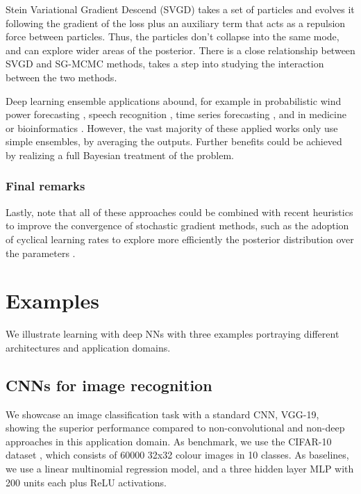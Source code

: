 Stein Variational Gradient Descend (SVGD) \citep{svgd} takes a set of particles and evolves it following the gradient of the loss plus an auxiliary term that acts as a repulsion force between particles. Thus, the particles don't collapse into the same mode, and can explore wider areas of the posterior. There is a close relationship between SVGD and SG-MCMC methods, \citep{gallego2018stochastic} takes a step into studying the interaction between the two methods.

Deep learning ensemble applications abound, for example in probabilistic wind power forecasting \citep{wang2017deep}, speech recognition \citep{deng2014ensemble}, time series forecasting \citep{qiu2014ensemble}, and in medicine or bioinformatics \citep{qummar2019deep,xiao2018deep,cao2020ensemble}. However, the vast majority of these applied works only use simple ensembles, by averaging the outputs. Further benefits could be achieved by realizing a full Bayesian treatment of the problem.


\subsubsection{Final remarks}
Lastly, note that all of these approaches could be combined with recent heuristics to improve the convergence of stochastic gradient methods, such as the adoption of cyclical learning rates to explore more efficiently the posterior distribution over the parameters \citep{7926641}.


\section{Examples}
We illustrate learning with deep NNs with three examples portraying
different architectures and application domains.

\subsection{CNNs for image recognition}\label{kkvision}

We showcase an image classification task with a standard CNN, VGG-19, showing the superior performance compared to non-convolutional and non-deep approaches in this application domain. As benchmark, we use the CIFAR-10 dataset \citep{krizhevsky2014cifar},
which consists of 60000 32x32 colour images in 10 classes. As baselines, we use a linear multinomial regression model, and a three hidden layer MLP with 200 units each plus ReLU activations.

